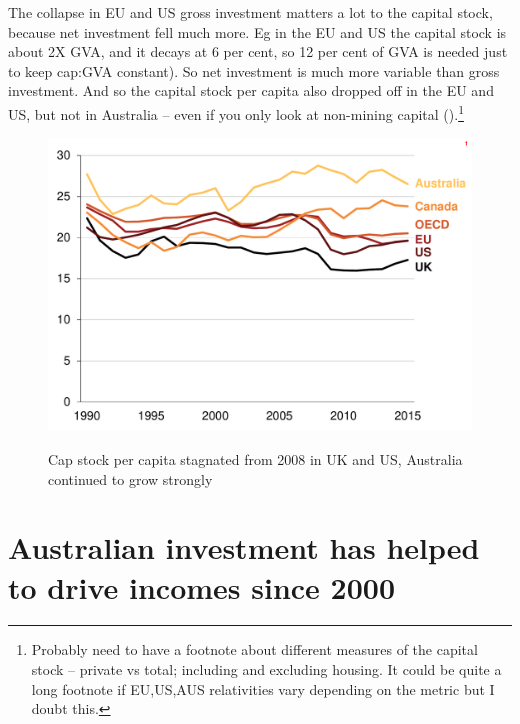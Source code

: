 
The collapse in EU and US gross investment matters a lot to the capital stock, because net investment fell much more. Eg in the EU and US the capital stock is about 2X GVA, and it decays at 6 per cent, so 12 per cent of GVA is needed just to keep cap:GVA constant). So net investment is much more variable than gross investment. And so the capital stock per capita also dropped off in the EU and US, but not in Australia -- even if you only look at non-mining capital ().\footnote{Probably need to have a footnote about different measures of the capital stock -- private vs total; including and excluding housing. It could be quite a long footnote if EU,US,AUS relativities vary depending on the metric but I doubt this.} 

\begin{figure}[p] 
 \caption{Cap stock per capita stagnated from 2008 in UK and US, Australia continued to grow strongly}
 \includegraphics[page=2]{atlas/Ch2.pdf}\label{fig:capstock}

\end{figure}


\section{Australian investment has helped to drive incomes since 2000}

